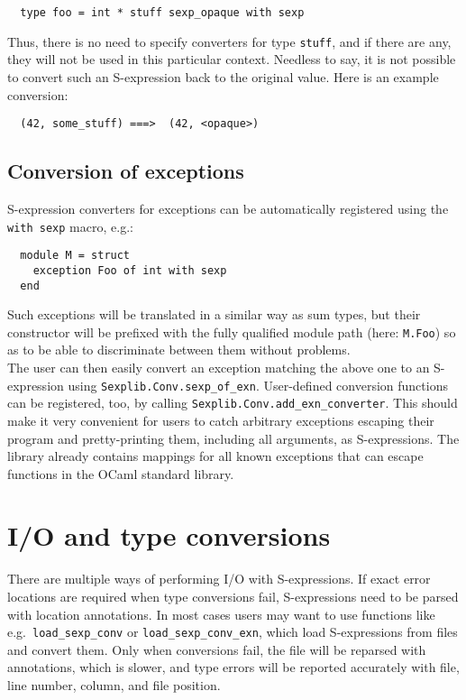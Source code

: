 \documentclass[a4paper]{article}
\begin{document}
\begin{verbatim}
  type foo = int * stuff sexp_opaque with sexp
\end{verbatim}

Thus, there is no need to specify converters for type \verb=stuff=,
and if there are any, they will not be used in this particular context.
Needless to say, it is not possible to convert such an S-expression back
to the original value.  Here is an example conversion:

\begin{verbatim}
  (42, some_stuff) ===>  (42, <opaque>)
\end{verbatim}

\subsection{Conversion of exceptions}

S-expression converters for exceptions can be automatically registered
using the \verb=with sexp= macro, e.g.:

\begin{verbatim}
  module M = struct
    exception Foo of int with sexp
  end
\end{verbatim}

Such exceptions will be translated in a similar way as sum types, but
their constructor will be prefixed with the fully qualified module path
(here: \verb=M.Foo=) so as to be able to discriminate between them
without problems.\\

The user can then easily convert an exception matching the above
one to an S-expression using \verb=Sexplib.Conv.sexp_of_exn=.
User-defined conversion functions can be registered, too, by calling
\verb=Sexplib.Conv.add_exn_converter=.  This should make it very
convenient for users to catch arbitrary exceptions escaping their program
and pretty-printing them, including all arguments, as S-expressions.
The library already contains mappings for all known exceptions that can
escape functions in the OCaml standard library.

\section{I/O and type conversions}

There are multiple ways of performing I/O with S-expressions.  If exact
error locations are required when type conversions fail, S-expressions need
to be parsed with location annotations.  In most cases users may want to use
functions like e.g.\ \verb=load_sexp_conv= or \verb=load_sexp_conv_exn=, which
load S-expressions from files and convert them.  Only when conversions fail,
the file will be reparsed with annotations, which is slower, and type errors
will be reported accurately with file, line number, column, and file position.
\end{document}
